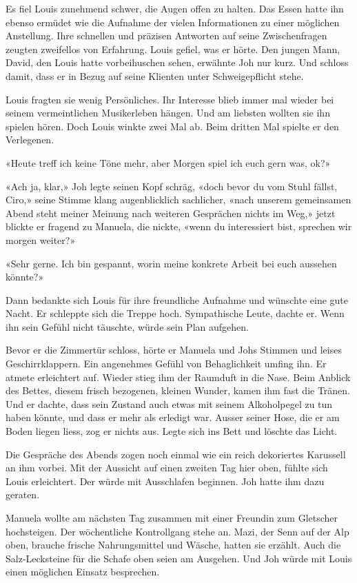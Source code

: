 Es fiel Louis zunehmend schwer, die Augen offen zu halten. Das Essen
hatte ihn ebenso ermüdet wie die Aufnahme der vielen Informationen zu
einer möglichen Anstellung. Ihre schnellen und präzisen Antworten auf
seine Zwischenfragen zeugten zweifellos von Erfahrung. Louis gefiel, was
er hörte. Den jungen Mann, David, den Louis hatte vorbeihuschen sehen,
erwähnte Joh nur kurz. Und schloss damit, dass er in Bezug auf seine
Klienten unter Schweigepflicht stehe.

Louis fragten sie wenig Persönliches. Ihr Interesse blieb immer mal
wieder bei seinem vermeintlichen Musikerleben hängen. Und am liebsten
wollten sie ihn spielen hören. Doch Louis winkte zwei Mal ab. Beim
dritten Mal spielte er den Verlegenen.

«Heute treff ich keine Töne mehr, aber Morgen spiel ich euch gern was,
ok?»

«Ach ja, klar,» Joh legte seinen Kopf schräg, «doch bevor du vom Stuhl
fällst, Ciro,» seine Stimme klang augenblicklich sachlicher, «nach
unserem gemeinsamen Abend steht meiner Meinung nach weiteren Gesprächen
nichts im Weg,» jetzt blickte er fragend zu Manuela, die nickte, «wenn
du interessiert bist, sprechen wir morgen weiter?»

«Sehr gerne. Ich bin gespannt, worin meine konkrete Arbeit bei euch
aussehen könnte?»

Dann bedankte sich Louis für ihre freundliche Aufnahme und wünschte eine
gute Nacht. Er schleppte sich die Treppe hoch. Sympathische Leute,
dachte er. Wenn ihn sein Gefühl nicht täuschte, würde sein Plan
aufgehen.

Bevor er die Zimmertür schloss, hörte er Manuela und Johs Stimmen und
leises Geschirrklappern. Ein angenehmes Gefühl von Behaglichkeit umfing
ihn. Er atmete erleichtert auf. Wieder stieg ihm der Raumduft in die
Nase. Beim Anblick des Bettes, diesem frisch bezogenen, kleinen Wunder,
kamen ihm fast die Tränen. Und er dachte, dass sein Zustand auch etwas
mit seinem Alkoholpegel zu tun haben könnte, und dass er mehr als
erledigt war. Ausser seiner Hose, die er am Boden liegen liess, zog er
nichts aus. Legte sich ins Bett und löschte das Licht.

Die Gespräche des Abends zogen noch einmal wie ein reich dekoriertes
Karussell an ihm vorbei. Mit der Aussicht auf einen zweiten Tag hier
oben, fühlte sich Louis erleichtert. Der würde mit Ausschlafen beginnen.
Joh hatte ihm dazu geraten.

Manuela wollte am nächsten Tag zusammen mit einer Freundin zum Gletscher
hochsteigen. Der wöchentliche Kontrollgang stehe an. Mazi, der Senn auf
der Alp oben, brauche frische Nahrungsmittel und Wäsche, hatten sie
erzählt. Auch die Salz-Lecksteine für die Schafe oben seien am Ausgehen.
Und Joh würde mit Louis einen möglichen Einsatz besprechen.

